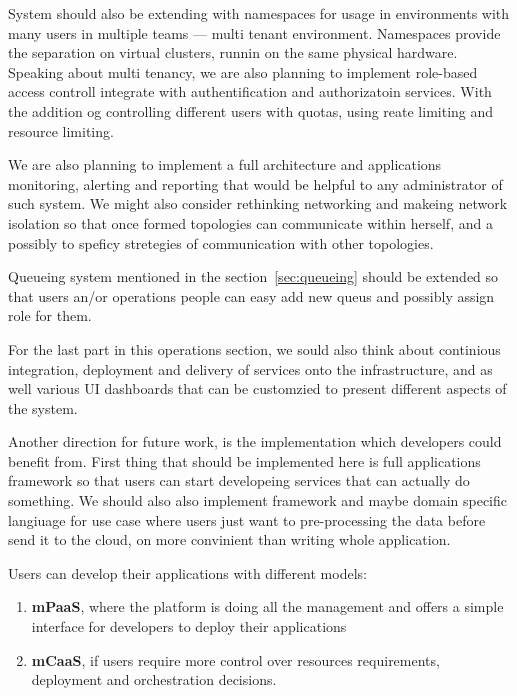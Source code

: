 System should also be extending with namespaces for usage in environments with many users in multiple teams --- multi tenant environment. Namespaces provide the separation on virtual clusters, runnin on the same physical hardware. Speaking about multi tenancy, we are also planning to implement role-based access controll integrate with authentification and authorizatoin services. With the addition og controlling different users with quotas, using reate limiting and resource limiting.

We are also planning to implement a full architecture and applications monitoring, alerting and reporting that would be helpful to any administrator of such system. We might also consider rethinking networking and makeing network isolation so that once formed topologies can communicate within herself, and a possibly to speficy 
stretegies of communication with other topologies.

Queueing system mentioned in the section~\ref{sec:queueing} should be extended so that users an/or operations people can easy add new queus and possibly assign role for them.
 
For the last part in this operations section, we sould also think about continious integration, deployment and delivery of services onto the infrastructure, and as well various UI dashboards that can be customzied to present different aspects of the system.

Another direction for future work, is the implementation which developers could benefit from. First thing that should be implemented here is full applications framework so that users can start developeing services that can actually do something. We should also also implement framework and maybe domain specific langiuage for use case where users just want to pre-processing the data before send it to the cloud, on more convinient than writing whole application.

Users can develop their applications with different models: 

\begin{enumerate}[start=1,label={(\bfseries \arabic*)}]
	\item \textbf{mPaaS}, where the platform is doing all the management and offers a simple interface for developers to deploy their applications
	\item \textbf{mCaaS}, if users require more control over resources requirements, deployment and orchestration decisions.
\end{enumerate}

